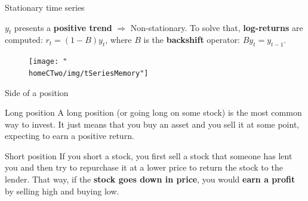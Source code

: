 \documentclass[usenames,dvipsnames]{beamer} %
\newcommand{\homeCTwo}{../../Chapter 2 - FracDiff/Draft}
\begin{document}
\begin{frame}{Stationary time series}

	$y_t$ presents a \textbf{positive trend} $\Rightarrow$ Non-stationary. To 
	solve that, \textbf{log-returns} are computed: $r_t = (1-B)y_t$, where 
	$B$ is the \textbf{backshift} operator: $B y_t = y_{t-1}$.
%	
%	
	
	\begin{figure}[hbtp]
	\centering
		\texttt{[image: "\\homeCTwo/img/tSeriesMemory"]}
	\end{figure}
	

\end{frame}

\begin{frame}{Side of a position}

\begin{block}{Long position}
A long position (or going long on some stock) is the most common way to 
invest. It just means that you buy an asset and you sell it at some point, 
expecting to earn a positive return.
\end{block}

\begin{block}{Short position}
If you short a stock, you first sell a stock that someone has lent you and 
then try to repurchase it at a lower price to return the stock to the lender. 
That way, if the \textbf{stock goes down in price}, you would \textbf{earn a 
profit} by selling high and buying low.
\end{block}


\end{frame}
\end{document}

